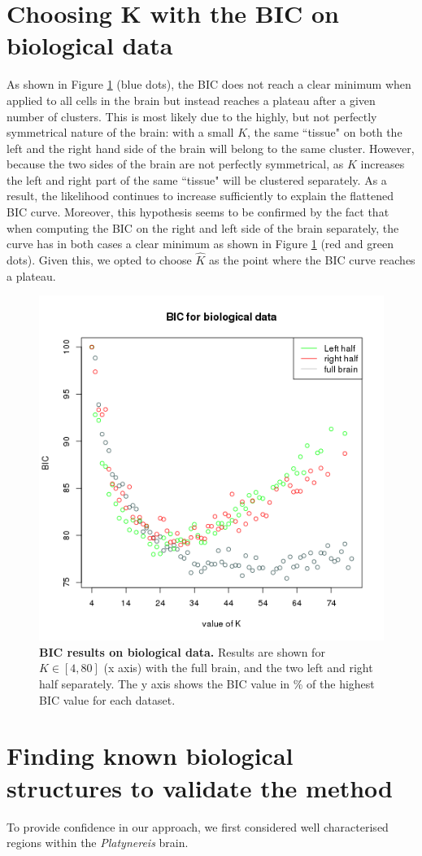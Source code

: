 	\section{Choosing K with the BIC on biological data}
	As shown in Figure \ref{fig:realBIC} (blue dots), the BIC does not reach a clear minimum when applied to all cells in the brain but instead reaches a plateau after a given number of clusters. This is most likely due to the highly, but not perfectly symmetrical nature of the brain: with a small $K$, the same ``tissue" on both the left and the right hand side of the brain will belong to the same cluster. However, because the two sides of the brain are not perfectly symmetrical, as $K$ increases the left and right part of the same ``tissue" will be clustered separately. As a result, the likelihood continues to increase sufficiently to explain the flattened BIC curve. Moreover, this hypothesis seems to be confirmed by the fact that when computing the BIC on the right and left side of the brain separately, the curve has in both cases a clear minimum as shown in Figure \ref{fig:realBIC} (red and green dots). Given this, we opted to choose $\hat{K}$ as the point where the BIC curve reaches a plateau.
	
	\begin{figure}[h]
\centerline{\includegraphics[width=0.6\linewidth]{gfx/chapter6/real_BIC.png}}
\caption{{\bf BIC results on biological data.} Results are shown for $K \in [4,80]$ (x axis) with the full brain, and the two left and right half separately. The y axis shows the BIC value in \% of the highest BIC value for each dataset.}
\label{fig:realBIC}
	\end{figure}

	\section{Finding known biological structures to validate the method}
	To provide confidence in our approach, we first considered well characterised regions within the {\it{Platynereis}} brain.
